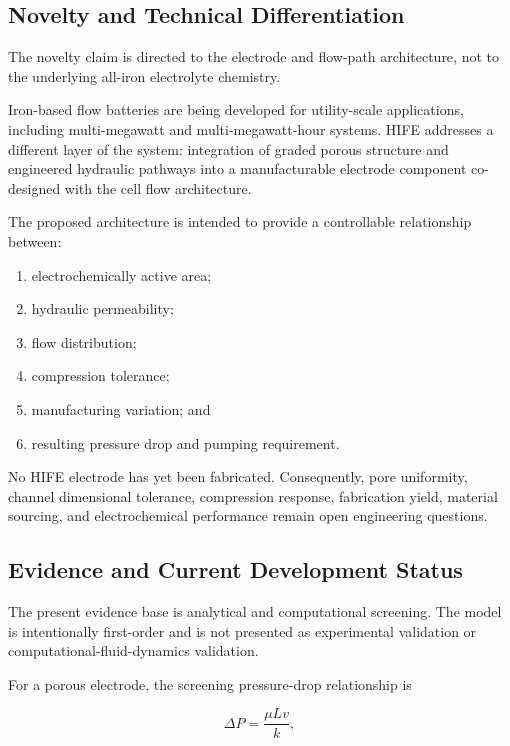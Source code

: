 \documentclass[11pt,letterpaper]{article}
\begin{document}
\subsection{Novelty and Technical Differentiation}

The novelty claim is directed to the electrode and flow-path architecture,
not to the underlying all-iron electrolyte chemistry.

Iron-based flow batteries are being developed for utility-scale applications,
including multi-megawatt and multi-megawatt-hour systems. HIFE addresses a
different layer of the system: integration of graded porous structure and
engineered hydraulic pathways into a manufacturable electrode component
co-designed with the cell flow architecture.

The proposed architecture is intended to provide a controllable relationship
between:

\begin{enumerate}
    \item electrochemically active area;
    \item hydraulic permeability;
    \item flow distribution;
    \item compression tolerance;
    \item manufacturing variation; and
    \item resulting pressure drop and pumping requirement.
\end{enumerate}

No HIFE electrode has yet been fabricated. Consequently, pore uniformity,
channel dimensional tolerance, compression response, fabrication yield,
material sourcing, and electrochemical performance remain open engineering
questions.

\subsection{Evidence and Current Development Status}

The present evidence base is analytical and computational screening. The
model is intentionally first-order and is not presented as experimental
validation or computational-fluid-dynamics validation.

For a porous electrode, the screening pressure-drop relationship is

\begin{equation}
\Delta P
=
\frac{\mu L v}{k},
\label{eq:pressure-drop}
\end{equation}
\end{document}
